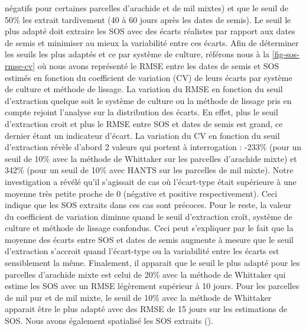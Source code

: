 négatifs pour certaines parcelles d'arachide et de mil mixtes) et que le seuil de 50\% les extrait tardivement (40 à 60 jours après les dates de semis). Le seuil le plus adapté doit extraire les SOS avec des écarts réalistes par rapport aux dates de semis et minimiser au mieux la variabilité entre ces écarts. Afin de déterminer les seuils les plus adaptés et ce par système de culture, référons nous à la \cref{fig-sos-rmse-cv} où nous avons représenté le RMSE entre les dates de semis et SOS estimés en fonction du coefficient de variation (CV) de leurs écarts par système de culture et méthode de lissage. La variation du RMSE en fonction du seuil d'extraction  quelque soit le système de culture ou la méthode de lissage pris en compte rejoint l'analyse sur la distribution des écarts. En effet, plus le seuil d'extraction croit et plus le RMSE entre SOS et dates de semis est grand, ce dernier étant un indicateur d'écart. La variation du CV en fonction du seuil d'extraction révèle d'abord 2 valeurs qui portent à interrogation : -233\% (pour un seuil de 10\% avec la méthode de Whittaker sur les parcelles d'arachide mixte) et 342\% (pour un seuil de 10\% avec HANTS sur les parcelles de mil mixte). Notre investigation a révélé qu'il s'agissait de cas où l'écart-type était supérieure à une moyenne très petite  proche de $0$ (négative et positive respectivement). Ceci indique que les SOS extraits dans ces cas sont précoces. Pour le reste, la valeur du coefficient de variation diminue quand le seuil d'extraction croît, système de culture et méthode de lissage confondus. Ceci peut s'expliquer par le fait que la moyenne des écarts entre SOS et dates de semis augmente à mesure que le seuil d'extraction s'accroit quand l'écart-type ou la variabilité entre les écarts est sensiblement la même. Finalement, il apparait que le seuil le plus adapté pour les parcelles d'arachide mixte est celui de 20\% avec la méthode de Whittaker qui estime les SOS avec un RMSE légèrement supérieur à 10 jours. Pour les parcelles de mil pur et de mil mixte, le seuil de 10\% avec la méthode de Whittaker apparait être le plus adapté avec des RMSE de 15 jours sur les estimations de SOS. Nous avons également spatialisé les SOS extraits ().

